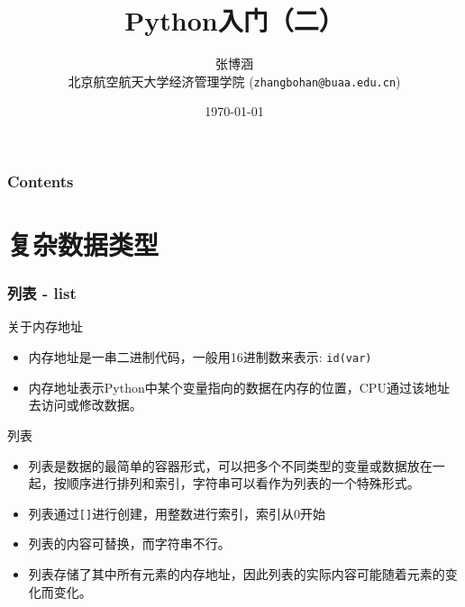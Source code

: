 \documentclass[10pt]{beamer}
\title{Python入门（二）}
\author{张博涵\\
北京航空航天大学经济管理学院 (\texttt{zhangbohan@buaa.edu.cn})}
\date{\today}
\begin{document}
\begin{frame}
\maketitle
\end{frame}


\begin{frame}
    \frametitle{Contents}
    \tableofcontents
\end{frame}

\section{复杂数据类型}
\begin{frame}
    \frametitle{列表 - list}

    \begin{block}{关于内存地址}
        \begin{itemize}
            \item 内存地址是一串二进制代码，一般用16进制数来表示: \texttt{id(var)}
            \item 内存地址表示Python中某个变量指向的数据在内存的位置，CPU通过该地址去访问或修改数据。
        \end{itemize}
    \end{block}

    \begin{block}{列表}
        \begin{itemize}
            \item 列表是数据的最简单的容器形式，可以把多个不同类型的变量或数据放在一起，按顺序进行排列和索引，字符串可以看作为列表的一个特殊形式。
            \item 列表通过\texttt{[]}进行创建，用整数进行索引，索引从0开始
            \item 列表的内容可替换，而字符串不行。
            \item 列表存储了其中所有元素的内存地址，因此列表的实际内容可能随着元素的变化而变化。
    \end{itemize}
    \end{block}


\end{frame}
\end{document}
